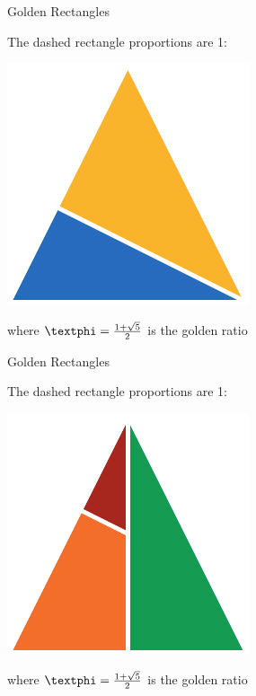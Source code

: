 \documentclass[14pt]{beamer}
\begin{document}
    \begin{frame}{Golden Rectangles}
        \begin{center}
            The dashed rectangle proportions are 1:\textphi
        \end{center}
        \hspace{4.1em} \includegraphics[scale=1.0]{figures/figure020e.pdf} \\
        \begin{center}
            where $\text{\textphi} =\tfrac{1+\sqrt{5}}{2}$ is the golden ratio
        \end{center}
    \end{frame}


    \begin{frame}{Golden Rectangles}
        \begin{center}
            The dashed rectangle proportions are 1:\textphi
        \end{center}
        \hspace{4.1em} \includegraphics[scale=1.0]{figures/figure020f.pdf} \\
        \begin{center}
            where $\text{\textphi} =\tfrac{1+\sqrt{5}}{2}$ is the golden ratio
        \end{center}
    \end{frame}
\end{document}
